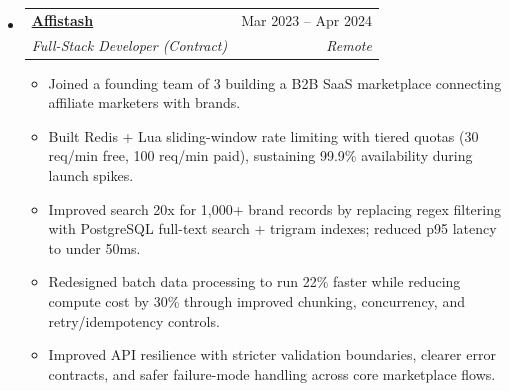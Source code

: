 \documentclass[a4paper,10pt]{article}
\makeatletter
\newcommand{\resumeItem}[1]{%
  \item\small{#1\vspace{-1pt}}%
}
\newcommand{\resumeSubheading}[4]{%
  \vspace{1pt}\item
  \begin{tabular*}{0.97\textwidth}[t]{l@{\extracolsep{\fill}}r}
    \textbf{#1} & #2 \\
    \textit{\small #3} & \textit{\small #4} \\
  \end{tabular*}\vspace{-6pt}%
}
\newcommand{\resumeItemListStart}{\begin{itemize}[itemsep=2pt]}
\newcommand{\resumeItemListEnd}{\end{itemize}\vspace{-2pt}}
\makeatother
\begin{document}
\begin{itemize}[leftmargin=0.15in, label={}]
  \resumeSubheading
    {\href{https://affistash.com}{\underline{\textbf{Affistash}}}}{Mar 2023 -- Apr 2024}
    {Full-Stack Developer (Contract)}{Remote}
  \resumeItemListStart
    \resumeItem{Joined a founding team of 3 building a B2B SaaS marketplace connecting affiliate marketers with brands.}
    \resumeItem{Built Redis + Lua sliding-window rate limiting with tiered quotas (30 req/min free, 100 req/min paid), sustaining 99.9\% availability during launch spikes.}
    \resumeItem{Improved search 20x for 1,000+ brand records by replacing regex filtering with PostgreSQL full-text search + trigram indexes; reduced p95 latency to under 50ms.}
    \resumeItem{Redesigned batch data processing to run 22\% faster while reducing compute cost by 30\% through improved chunking, concurrency, and retry/idempotency controls.}
    \resumeItem{Improved API resilience with stricter validation boundaries, clearer error contracts, and safer failure-mode handling across core marketplace flows.}
  \resumeItemListEnd

\end{itemize}

\end{document}
